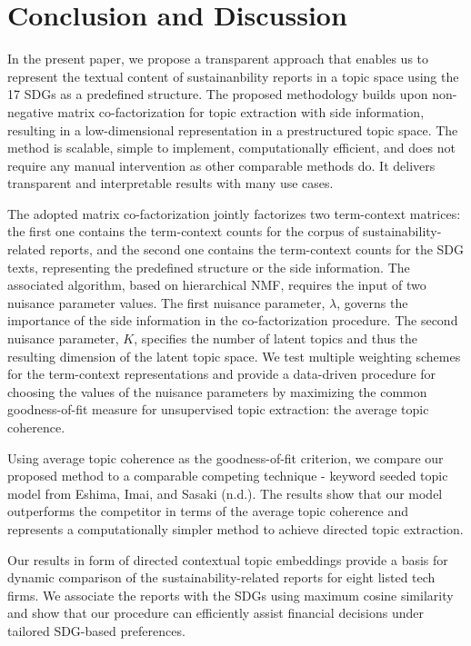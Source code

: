 \documentclass[
]{article}
\begin{document}
\hypertarget{conclusion-and-discussion}{%
\section{Conclusion and Discussion}\label{conclusion-and-discussion}}

In the present paper, we propose a transparent approach that enables us to represent the textual content of sustainanbility reports in a topic space using the 17 SDGs as a predefined structure. The proposed methodology builds upon non-negative matrix co-factorization for topic extraction with side information, resulting in a low-dimensional representation in a prestructured topic space. The method is scalable, simple to implement, computationally efficient, and does not require any manual intervention as other comparable methods do. It delivers transparent and interpretable results with many use cases.

The adopted matrix co-factorization jointly factorizes two term-context matrices: the first one contains the term-context counts for the corpus of sustainability-related reports, and the second one contains the term-context counts for the SDG texts, representing the predefined structure or the side information. The associated algorithm, based on hierarchical NMF, requires the input of two nuisance parameter values. The first nuisance parameter, \(\lambda\), governs the importance of the side information in the co-factorization procedure. The second nuisance parameter, \(K\), specifies the number of latent topics and thus the resulting dimension of the latent topic space. We test multiple weighting schemes for the term-context representations and provide a data-driven procedure for choosing the values of the nuisance parameters by maximizing the common goodness-of-fit measure for unsupervised topic extraction: the average topic coherence.

Using average topic coherence as the goodness-of-fit criterion, we compare our proposed method to a comparable competing technique - keyword seeded topic model from Eshima, Imai, and Sasaki (n.d.). The results show that our model outperforms the competitor in terms of the average topic coherence and represents a computationally simpler method to achieve directed topic extraction.

Our results in form of directed contextual topic embeddings provide a basis for dynamic comparison of the sustainability-related reports for eight listed tech firms. We associate the reports with the SDGs using maximum cosine similarity and show that our procedure can efficiently assist financial decisions under tailored SDG-based preferences.
\end{document}
